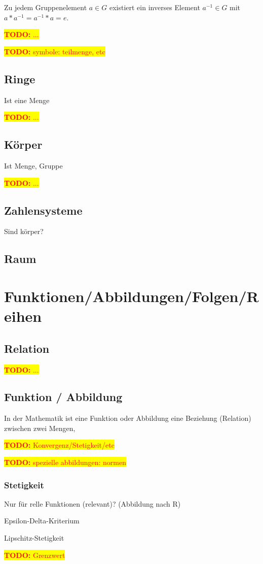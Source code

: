 \documentclass[10pt,a4paper]{article}
\newcommand{\todo}[1]{\begin{flushleft} \colorbox{yellow}{\textcolor{red}{\textbf{TODO:} {#1}}}\end{flushleft} }
\begin{document}
Zu jedem Gruppenelement $a\in G$ existiert ein inverses Element $a^{{-1}}\in G$ mit $ a*a^{{-1}}=a^{{-1}}*a=e$.

\todo{...}

\todo{symbole: teilmenge, etc}

\subsection{Ringe}
Ist eine Menge
\todo{...}
\subsection{Körper}
Ist Menge, Gruppe
\todo{...}


\subsection{Zahlensysteme}
	Sind körper?

\subsection{Raum}

\section{Funktionen/Abbildungen/Folgen/Reihen}

\subsection{Relation}
\todo{...}

\subsection{Funktion / Abbildung}
In der Mathematik ist eine Funktion oder Abbildung eine Beziehung (Relation) zwischen zwei Mengen, 

\todo{Konvergenz/Stetigkeit/etc}


\todo{spezielle abbildungen: normen }


\subsubsection{Stetigkeit}
Nur für relle Funktionen (relevant)?  (Abbildung nach R) 

Epsilon-Delta-Kriterium

Lipschitz-Stetigkeit


\todo{Grenzwert}
\end{document}
